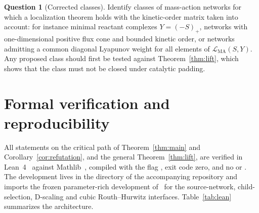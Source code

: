 \documentclass[11pt,a4paper]{article}
\theoremstyle{plain}
\theoremstyle{definition}
\newtheorem{question}[theorem]{Question}
\theoremstyle{remark}
\newcommand{\LMA}{\mathcal{L}_{\mathrm{MA}}}
\begin{document}
\begin{question}[Corrected classes]
Identify classes of mass-action networks for which a localization theorem holds with the kinetic-order matrix taken into account: for instance minimal reactant complexes $Y=(-S)_+$, networks with one-dimensional positive flux cone and bounded kinetic order, or networks admitting a common diagonal Lyapunov weight for all elements of $\LMA(S,Y)$. Any proposed class should first be tested against Theorem~\ref{thm:lift}, which shows that the class must not be closed under catalytic padding.
\end{question}

\section{Formal verification and reproducibility}\label{sec:formal}

All statements on the critical path of Theorem~\ref{thm:main} and Corollary~\ref{cor:refutation}, and the general Theorem~\ref{thm:lift}, are verified in Lean~4~\cite{Lean4} against Mathlib~\cite{Mathlib}, compiled with the flag , exit code zero, and no  or . The development lives in the directory  of the accompanying repository and imports the frozen parameter-rich development of~\cite{Companion2026} for the source-network, child-selection, D-scaling and cubic Routh--Hurwitz interfaces. Table~\ref{tab:lean} summarizes the architecture.
\end{document}
